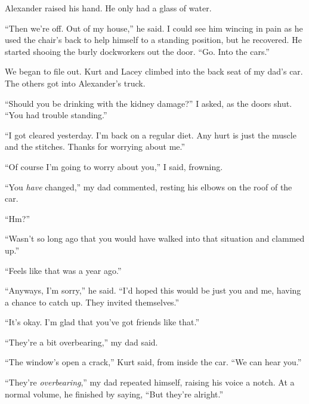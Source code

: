 Alexander raised his hand.  He only had a glass of water.



``Then we're off.  Out of my house,'' he said.  I could see him wincing in pain as he used the chair's back to help himself to a standing position, but he recovered.  He started shooing the burly dockworkers out the door.  ``Go.  Into the cars.''



We began to file out.  Kurt and Lacey climbed into the back seat of my dad's car.  The others got into Alexander's truck.



``Should you be drinking with the kidney damage?'' I asked, as the doors shut.  ``You had trouble standing.''



``I got cleared yesterday.  I'm back on a regular diet.  Any hurt is just the muscle and the stitches.  Thanks for worrying about me.''



``Of course I'm going to worry about you,'' I said, frowning.



``You \emph{have} changed,'' my dad commented, resting his elbows on the roof of the car.



``Hm?''



``Wasn't so long ago that you would have walked into that situation and clammed up.''



``Feels like that was a year ago.''



``Anyways, I'm sorry,'' he said.  ``I'd hoped this would be just you and me, having a chance to catch up.  They invited themselves.''



``It's okay.  I'm glad that you've got friends like that.''



``They're a bit overbearing,'' my dad said.



``The window's open a crack,'' Kurt said, from inside the car.  ``We can hear you.''



``They're \emph{overbearing},'' my dad repeated himself, raising his voice a notch.  At a normal volume, he finished by saying, ``But they're alright.''



